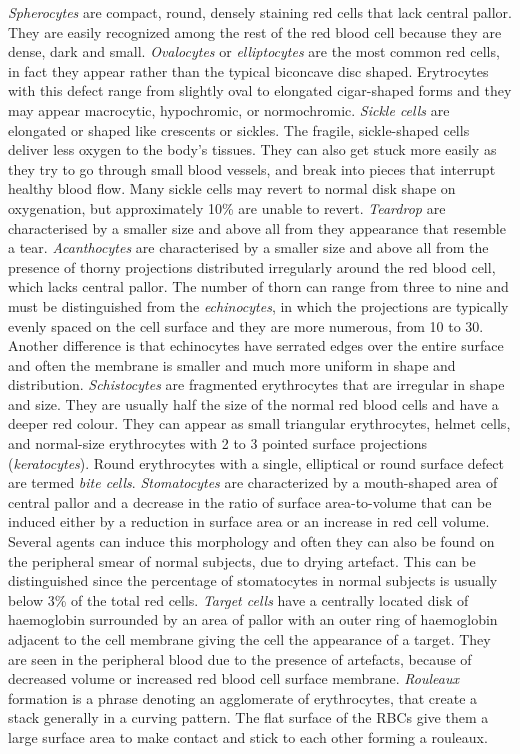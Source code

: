 \documentclass[final,a4paper,12pt,english]{UnicaPhdThesis3}
\begin{document}
\textit{Spherocytes} are compact, round, densely staining red cells that lack central pallor. They are easily recognized among the rest of the red blood cell because they are dense, dark and small. \textit{Ovalocytes} or \textit{elliptocytes} are the most common red cells, in fact they appear rather than the typical biconcave disc shaped. Erytrocytes with this defect range from slightly oval to elongated cigar-shaped forms and they may appear macrocytic, hypochromic, or normochromic.  \textit{Sickle cells} are elongated or shaped like crescents or sickles. The fragile, sickle-shaped cells deliver less oxygen to the body's tissues. They can also get stuck more easily as they try to go through small blood vessels, and break into pieces that interrupt healthy blood flow. Many sickle cells may revert to normal disk shape on oxygenation, but approximately 10\% are unable to revert.
\textit{Teardrop} are characterised by a smaller size and above all from they appearance that resemble a tear. \textit{Acanthocytes} are characterised by a smaller size and above all from the presence of thorny projections distributed irregularly around the red blood cell, which lacks central pallor. The number of thorn can range from three to nine and must be distinguished from the \textit{echinocytes}, in which the projections are typically evenly spaced on the cell surface and they are more numerous, from 10 to 30. Another difference is that echinocytes have serrated edges over the entire surface and often the membrane is smaller and much more uniform in shape and distribution. \textit{Schistocytes} are fragmented erythrocytes  that are irregular in shape and size. They are usually half the size of the normal red blood cells and have a deeper red colour. They can appear as small triangular erythrocytes, helmet cells, and normal-size erythrocytes with 2 to 3 pointed surface  projections (\textit{keratocytes}). Round erythrocytes with a single, elliptical or round surface defect are termed \textit{bite cells}. \textit{Stomatocytes} are characterized by a mouth-shaped area of central pallor and a decrease in the ratio of surface area-to-volume that can be induced either by a reduction in surface area or an increase in red cell volume. Several agents can induce this morphology and often they can also be found on the peripheral smear of normal subjects, due to drying artefact. This can be distinguished since the percentage of stomatocytes in normal subjects is usually below 3\% of the total red cells. \textit{Target cells} have a centrally located disk of haemoglobin surrounded by an area of pallor with an outer ring of haemoglobin adjacent to the cell membrane giving the cell the appearance of a target. They are seen in the peripheral blood due to the presence of artefacts, because of decreased volume or increased red blood cell surface membrane. \textit{Rouleaux} formation is a phrase denoting an agglomerate of erythrocytes, that create a stack generally in a curving pattern. The flat surface of the RBCs give them a large surface area to make contact and stick to each other forming a rouleaux. 
\end{document}
